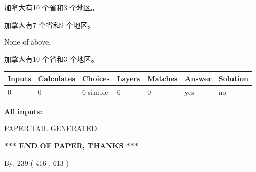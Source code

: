 \documentclass{ctexart}
\begin{document}
 
加拿大有10 个省和3 个地区。
 
 
加拿大有7 个省和9 个地区。
 
 
 None of above.
 
 
\noindent{}
 
 
加拿大有10 个省和3 个地区。
 
 
\noindent{}
 
 
   
   
   
   
\noindent\begin{tabular}{|l|l|l|l|l|l|l|}
 \hline
Inputs & Calculates & Choices & Layers & Matches & Answer & Solution \\ \hline
 0  & 
 0  & 
 6
  simple  
  & 
 6  & 
 0  & 
  yes & 
  no 
  \\ \hline
 \end{tabular}
   
   
   
   
\noindent{}
   
   
   
   
\noindent\vspace{0.1in}\hspace{-0.08in} {\textbf{\Large{All inputs: }}}
   
   
   
   
   
   
 \vspace{0.2in}
 
   
   
\vspace{2.0in} PAPER TAIL GENERATED.
   
   
   
   
\vspace{1.0in} 
{\textbf{\large{ *** END OF PAPER, THANKS *** }}} 
   
   
\hspace{1.0in} By: 
 239 ( 416 ,  613 )
   
   
   
   
\newpage 
\setcounter{page}{ 
   525001 } 
   
   
   
\end{document}
